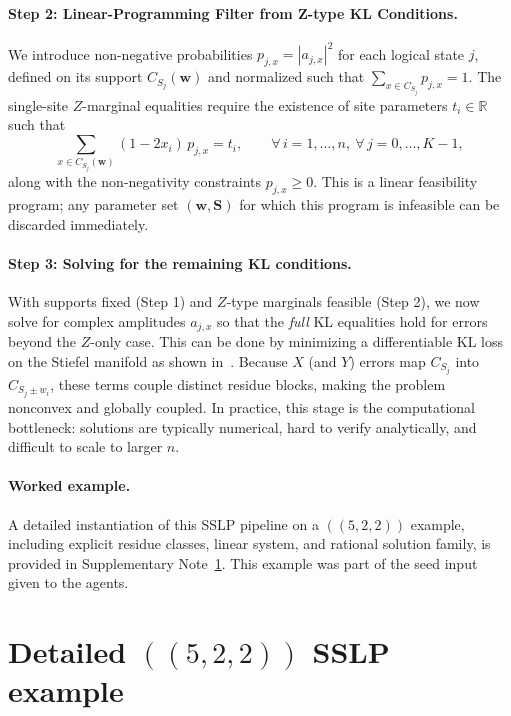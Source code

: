 \documentclass[pdflatex,sn-nature]{sn-jnl}%
\theoremstyle{thmstyleone}%
\theoremstyle{thmstyletwo}%
\theoremstyle{thmstylethree}%
\begin{document}
\begin{appendices}
\paragraph{Step 2: Linear-Programming Filter from Z-type KL Conditions.}
We introduce non-negative probabilities $p_{j,x}=|a_{j,x}|^2$ for each logical state $j$, defined on its support $C_{S_j}(\mathbf w)$ and normalized such that $\sum_{x\in C_{S_j}} p_{j,x}=1$. The single-site $Z$-marginal equalities require the existence of site parameters $t_i\in\mathbb R$ such that
\[
    \sum_{x\in C_{S_j}(\mathbf w)} (1-2x_i)\,p_{j,x} =  t_i,
    \qquad \forall\, i=1,\dots,n,\ \forall\, j=0,\dots,K-1,
\]
along with the non-negativity constraints $p_{j,x}\ge 0$. This is a linear feasibility program; any parameter set $(\mathbf w,\mathbf S)$ for which this program is infeasible can be discarded immediately.


\paragraph{Step 3: Solving for the remaining KL conditions.}
With supports fixed (Step 1) and $Z$-type marginals feasible (Step 2), we now solve for complex amplitudes $a_{j,x}$ so that the \emph{full} KL equalities hold for errors beyond the $Z$-only case. This can be done by minimizing a differentiable KL loss on the Stiefel manifold as shown in~\cite{Zhang2025Transversal}. Because $X$ (and $Y$) errors map $C_{S_j}$ into $C_{S_j\pm w_i}$, these terms couple distinct residue blocks, making the problem nonconvex and globally coupled. In practice, this stage is the computational bottleneck: solutions are typically numerical, hard to verify analytically, and difficult to scale to larger $n$.

\paragraph{Worked example.}
A detailed instantiation of this SSLP pipeline on a $((5,2,2))$ example, including explicit residue classes, linear system, and rational solution family, is provided in Supplementary Note~\ref{supp:example-522}. This example was part of the seed input given to the agents.




\section{Detailed \texorpdfstring{$((5,2,2))$}{((5,2,2))} SSLP example}
\label{supp:example-522}


\end{appendices}
\end{document}
